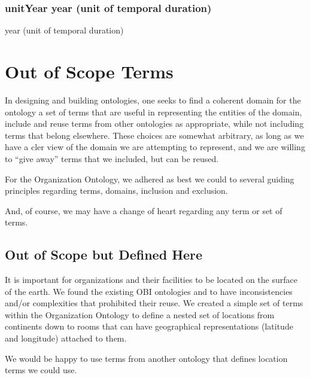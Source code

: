 \documentclass[letterpaper,10pt,english]{sphinxmanual}
\begin{document}
\subsection{unitYear \sphinxhyphen{} year (unit of temporal duration)}
\label{\detokenize{doc-unitYear:unityear-year-unit-of-temporal-duration}}\label{\detokenize{doc-unitYear:index-0}}\label{\detokenize{doc-unitYear::doc}}
\begin{sphinxShadowBox}

\sphinxAtStartPar
year (unit of temporal duration)
\end{sphinxShadowBox}

\begin{sphinxShadowBox}

\sphinxAtStartPar
{}
\end{sphinxShadowBox}


\chapter{Out of Scope Terms}
\label{\detokenize{out-of-scope:out-of-scope-terms}}\label{\detokenize{out-of-scope::doc}}
\sphinxAtStartPar
In designing and building ontologies, one seeks to find a coherent domain for the
ontology \textendash{} a set of terms that are useful in representing the entities of the domain,
include and reuse terms from other ontologies as appropriate, while not including terms
that belong elsewhere.  These choices are somewhat arbitrary, as long as we have a
cler view of the domain we are attempting to represent, and we are willing to “give away”
terms that we included, but can be reused.

\sphinxAtStartPar
For the Organization Ontology, we adhered as best we could to several guiding principles
regarding terms, domains, inclusion and exclusion.

\sphinxAtStartPar
And, of course, we may have a change of heart regarding any term or set of terms.


\section{Out of Scope but Defined Here}
\label{\detokenize{out-of-scope:out-of-scope-but-defined-here}}
\begin{sphinxShadowBox}

\sphinxAtStartPar
It is important for organizations and their facilities to be located on the surface of
the earth.  We found the existing OBI ontologies  and  to have
inconsistencies
and/or complexities that prohibited their reuse.  We created a simple  set of terms
within
the Organization Ontology to define a nested set of locations from continents down
to rooms that can have geographical representations (latitude and longitude) attached
to them.

\sphinxAtStartPar
We would be happy to use terms from another ontology that defines location terms we
could use.
\end{sphinxShadowBox}
\end{document}
